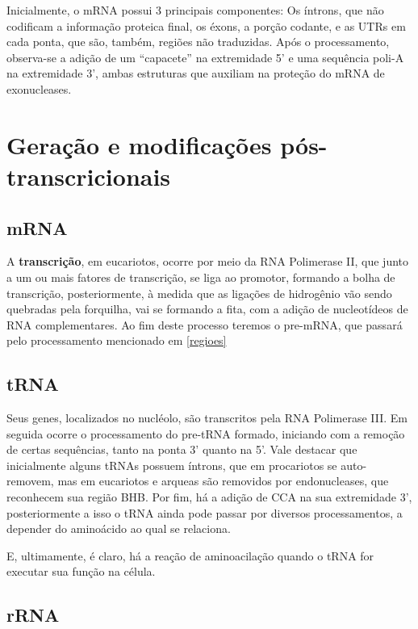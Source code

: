 \documentclass[
]{book}
\begin{document}
Inicialmente, o mRNA possui 3 principais componentes: Os íntrons, que não codificam a informação proteica final, os éxons, a porção codante, e as UTRs em cada ponta, que são, também, regiões não traduzidas. Após o processamento, observa-se a adição de um ``capacete'' na extremidade 5' e uma sequência poli-A na extremidade 3', ambas estruturas que auxiliam na proteção do mRNA de exonucleases.

\hypertarget{gerauxe7uxe3o-e-modificauxe7uxf5es-puxf3s-transcricionais}{%
\section{Geração e modificações pós-transcricionais}\label{gerauxe7uxe3o-e-modificauxe7uxf5es-puxf3s-transcricionais}}

\hypertarget{mrna}{%
\subsection{mRNA}\label{mrna}}

A \textbf{transcrição}, em eucariotos, ocorre por meio da RNA Polimerase II, que junto a um ou mais fatores de transcrição, se liga
ao promotor, formando a bolha de transcrição, posteriormente, à medida que as ligações de hidrogênio vão sendo quebradas pela forquilha, vai se formando a fita, com a adição de nucleotídeos de RNA complementares. Ao fim deste processo teremos o pre-mRNA, que passará pelo processamento mencionado em \ref{regioes}

\hypertarget{trna}{%
\subsection{tRNA}\label{trna}}

Seus genes, localizados no nucléolo, são transcritos pela RNA Polimerase III. Em seguida ocorre o processamento do pre-tRNA formado, iniciando com a remoção de certas sequências, tanto na ponta 3' quanto na 5'. Vale destacar que inicialmente alguns tRNAs possuem íntrons, que em procariotos se auto-removem, mas em eucariotos e arqueas são removidos por endonucleases, que reconhecem sua região BHB. Por fim, há a adição de CCA na sua extremidade 3', posteriormente a isso o tRNA ainda pode passar por diversos processamentos, a depender do aminoácido ao qual se relaciona.

E, ultimamente, é claro, há a reação de aminoacilação quando o tRNA for executar sua função na célula.

\hypertarget{rrna}{%
\subsection{rRNA}\label{rrna}}
\end{document}
